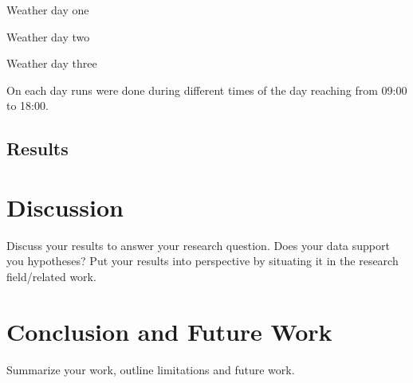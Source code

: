 Weather day one

Weather day two

Weather day three

On each day runs were done during different times of the day reaching from 09:00 to 18:00. 


\subsection{Results}

\section{Discussion}
Discuss your results to answer your research question. Does your data support you hypotheses? Put your results into perspective by situating it in the research field/related work.

\section{Conclusion and Future Work}
Summarize your work, outline limitations and future work. 










